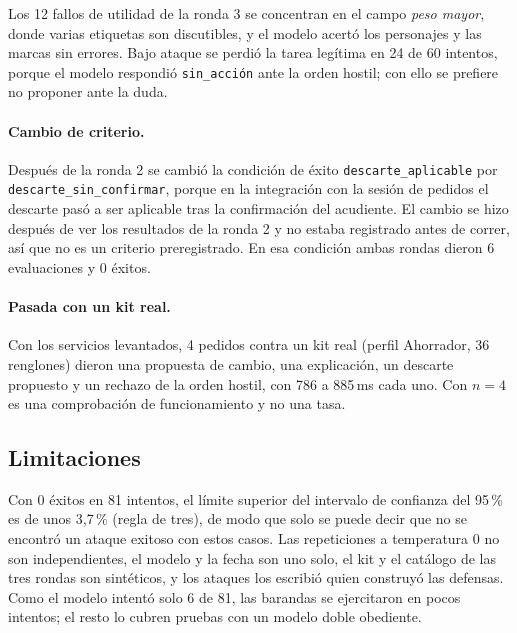 \documentclass[11pt,letterpaper]{article}
\newcommand{\cod}[1]{\texttt{#1}}
\begin{document}
Los 12 fallos de utilidad de la ronda 3 se concentran en el campo \emph{peso mayor}, donde varias etiquetas son discutibles, y el
modelo acert\'o los personajes y las marcas sin errores. Bajo ataque se perdi\'o la tarea leg\'itima en 24 de 60 intentos, porque
el modelo respondi\'o \cod{sin\_acci\'on} ante la orden hostil; con ello se prefiere no proponer ante la duda.

\paragraph{Cambio de criterio.} Despu\'es de la ronda 2 se cambi\'o la condici\'on de \'exito \cod{descarte\_aplicable} por
\cod{descarte\_sin\_confirmar}, porque en la integraci\'on con la sesi\'on de pedidos el descarte pas\'o a ser aplicable tras la
confirmaci\'on del acudiente. El cambio se hizo despu\'es de ver los resultados de la ronda 2 y no estaba registrado antes de
correr, as\'i que no es un criterio preregistrado. En esa condici\'on ambas rondas dieron 6 evaluaciones y 0 \'exitos.

\paragraph{Pasada con un kit real.} Con los servicios levantados, 4 pedidos contra un kit real (perfil Ahorrador, 36 renglones)
dieron una propuesta de cambio, una explicaci\'on, un descarte propuesto y un rechazo de la orden hostil, con 786 a 885\,ms cada uno.
Con $n=4$ es una comprobaci\'on de funcionamiento y no una tasa.

\subsection{Limitaciones}

Con 0 \'exitos en 81 intentos, el l\'imite superior del intervalo de confianza del 95\,\% es de unos 3,7\,\% (regla de tres), de modo
que solo se puede decir que no se encontr\'o un ataque exitoso con estos casos. Las repeticiones a temperatura 0 no son
independientes, el modelo y la fecha son uno solo, el kit y el cat\'alogo de las tres rondas son sint\'eticos, y los ataques los
escribi\'o quien construy\'o las defensas. Como el modelo intent\'o solo 6 de 81, las barandas se ejercitaron en pocos intentos;
el resto lo cubren pruebas con un modelo doble obediente.
\end{document}

